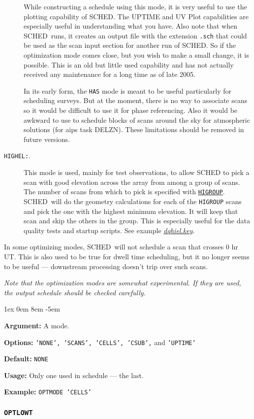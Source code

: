 \documentclass{report}
\newcommand{\sched}{{\sc SCHED}}
\newcommand{\schedb}{{\sc SCHED~}}
\newcommand{\rcwbox}[5]{
  \begin{list}{}{\parsep 1ex  \itemsep 0em
                 \leftmargin 8em  \itemindent -5em }
    \item {\bf Argument:} #1
    \item {\bf Options:}  #2
    \item {\bf Default:}  #3
    \item {\bf Usage:}    #4
    \item {\bf Example:}  #5
  \end{list}
}
\begin{document}
\begin{description}
While constructing a schedule using this mode, it is very useful to
use the plotting capability of \sched.  The UPTIME and UV Plot capabilities
are especially useful in understanding what you have.  Also note that
when \schedb runs, it creates an output file with the extension {\tt .sch}
that could be used as the scan input section for another run of \sched.
So if the optimization mode comes close, but you wish to make a small change,
it is possible.  This is an old but little used capability and has not
actually received any maintenance for a long time as of late 2005.


In its early form, the {\tt HAS} mode is meant to be useful particularly for
scheduling surveys.  But at the moment, there is no way to associate scans
so it would be difficult to use it for phase referencing.  Also it would
be awkward to use to schedule blocks of scans around the sky for atmospheric
solutions (for aips task DELZN).  These limitations should be removed
in future versions.

\item[{\tt HIGHEL:}.] This mode is used, mainly for test observations,
to allow SCHED to pick a scan with good elevation across the array from
among a group of scans.  The number of scans from which to pick is
specified with 
{\hyperref[MP:HIGROUP]{{\tt HIGROUP}}}.  \schedb will do the 
geometry calculations for each of the {\tt HIGROUP} scans and pick the
one with the highest minimum elevation.  It will keep that scan and
skip the others in the group.  This is especially useful for the 
data quality tests and startup scripts.  See example 
{\href{examples/dqhiel.key}{{\sl dqhiel.key}}}.

\end{description}

In some optimizing modes, \schedb will not schedule a scan that crosses
0 hr UT.  This is also used to be true for dwell time scheduling, but it
no longer seems to be useful --- downstream processing doesn't trip over
such scans.

{\sl Note that the optimization modes are somewhat experimental.  If
they are used, the output schedule should be checked carefully.}

\rcwbox
{A mode.}
{{\tt 'NONE', 'SCANS', 'CELLS', 'CSUB',} and {\tt 'UPTIME'}}
{\tt NONE}
{Only one used in schedule --- the last.}
{{\tt OPTMODE 'CELLS'}}


\subsubsection{\label{MP:OPTLOWT}{\tt OPTLOWT}}
\end{document}
